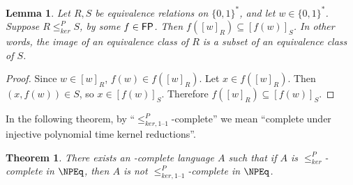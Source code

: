 \documentclass{article}
\newtheorem{theorem}{Theorem}[section]
\newtheorem{lemma}[lemma]{Lemma}
\theoremstyle{definition} \newtheorem{definition}[definition]{Definition}
\newcommand{\sigmastar}{\{0, 1\}^{*}} %
\newcommand{\kr}{\leq^{P}_{ker}} %
\newcommand{\kri}{\leq^{P}_{ker,1\text{--}1}} %
\begin{document}
\begin{lemma}\label{lem:image}
  Let $R,S$ be equivalence relations on $\sigmastar$, and let $w\in\sigmastar$.
  Suppose $R\kr S$, by some $f\in{\ensuremath{\mathsf{FP}}}$.
  Then $f([w]_R)\subseteq [f(w)]_S$.
  In other words, the image of an equivalence class of $R$ is a subset of an equivalence class of $S$.
\end{lemma}
\begin{proof}
  Since $w\in [w]_R$, $f(w)\in f([w]_R)$.
  Let $x\in f([w]_R)$.
  Then $(x, f(w))\in S$, so $x\in [f(w)]_S$.
  Therefore $f([w]_R)\subseteq [f(w)]_S$.
\end{proof}

In the following theorem, by ``$\kri$-complete'' we mean ``complete under injective polynomial time kernel reductions''.

\begin{theorem}
  There exists an \NP-complete language $A$ such that if $A$ is $\kr$-complete
  in $\NPEq$, then $A$ is not $\kri$-complete in $\NPEq$.
\end{theorem}
\end{document}
